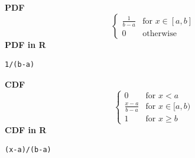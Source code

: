\smallskip \noindent \hspace{.2cm} \textbf{PDF} 
\begin{equation*}\begin{cases}
                  \frac{1}{b - a} & \text{for } x \in [a,b]  \\
                  0               & \text{otherwise}
                \end{cases}\end{equation*}
\smallskip \noindent \hspace{.2cm} \textbf{PDF in R}  
\begin{verbatim}1/(b-a)\end{verbatim}
\smallskip \noindent \hspace{.2cm} \textbf{CDF} 
\begin{equation*}\begin{cases}
                  0               & \text{for } x < a \\
                  \frac{x-a}{b-a} & \text{for } x \in [a,b) \\
                  1               & \text{for } x \ge b
                \end{cases}\end{equation*}
\smallskip \noindent \hspace{.2cm} \textbf{CDF in R}  
\begin{verbatim}(x-a)/(b-a)\end{verbatim}
%
%
% 
%
%
%
